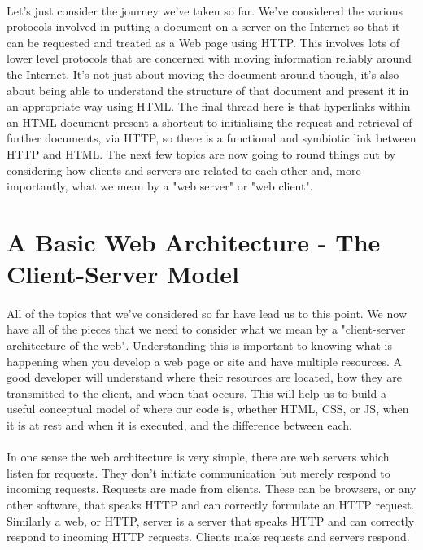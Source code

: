 \documentclass[12pt, a4paper, oneside]{book}
\begin{document}
\paragraph{} Let's just consider the journey we've taken so far. We've considered the various protocols involved in putting a document on a server on the Internet so that it can be requested and treated as a Web page using HTTP. This involves lots of lower level protocols that are concerned with moving information reliably around the Internet. It's not just about moving the document around though, it's also about being able to understand the structure of that document and present it in an appropriate way using HTML. The final thread here is that hyperlinks within an HTML document present a shortcut to initialising the request and retrieval of further documents, via HTTP, so there is a functional and symbiotic link between HTTP and HTML. The next few topics are now going to round things out by considering how clients and servers are related to each other and, more importantly, what we mean by a "web server" or "web client".

\section{A Basic Web Architecture - The Client-Server Model}

\paragraph{} All of the topics that we've considered so far have lead us to this point. We now have all of the pieces  that we need to consider what we mean by a "client-server architecture of the web". Understanding this is important to knowing what is happening when you develop a web page or site and have multiple resources. A good developer will understand where their resources are located, how they are transmitted to the client, and when that occurs. This will help us to build a useful conceptual model of where our code is, whether HTML, CSS, or JS, when it is at rest and when it is executed, and the difference between each.
\paragraph{} In one sense the web architecture is very simple, there are web servers which listen for requests. They don't initiate communication but merely respond to incoming requests. Requests are made from clients. These can be browsers, or any other software, that speaks HTTP and can correctly formulate an HTTP request. Similarly a web, or HTTP, server is a server that speaks HTTP and can correctly respond to incoming HTTP requests. Clients make requests and servers respond.
\end{document}
